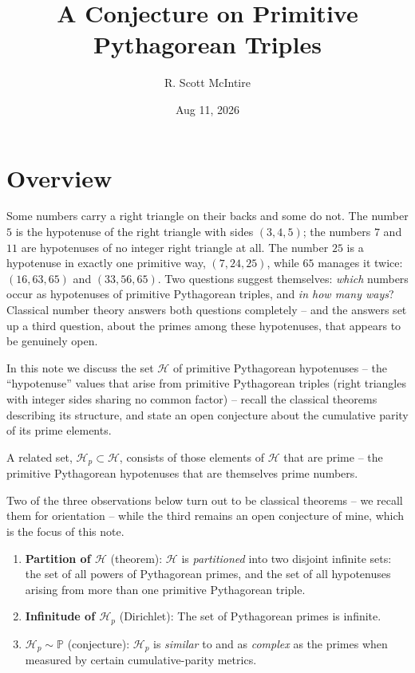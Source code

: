 \documentclass{article}
\title{A Conjecture on Primitive Pythagorean Triples}
\author{R. Scott McIntire}
\date{Aug 11, 2026}
\theoremstyle{plain}
\theoremstyle{definition}
\theoremstyle{remark}
\begin{document}
\maketitle


\section{Overview}
Some numbers carry a right triangle on their backs and some do not.
The number $5$ is the hypotenuse of the right triangle with sides
$(3,4,5)$; the numbers $7$ and $11$ are hypotenuses of no integer right
triangle at all. The number $25$ is a hypotenuse in exactly one
primitive way, $(7,24,25)$, while $65$ manages it twice:
$(16,63,65)$ and $(33,56,65)$. Two questions suggest themselves:
{\em which\/} numbers occur as hypotenuses of primitive Pythagorean
triples, and {\em in how many ways\/}? Classical number theory answers
both questions completely -- and the answers set up a third question,
about the primes among these hypotenuses, that appears to be genuinely
open.

In this note we discuss the set $\mathcal{H}$ of primitive Pythagorean hypotenuses --
the ``hypotenuse'' values that arise from primitive Pythagorean triples
(right triangles with integer sides sharing no common factor) --
recall the classical theorems describing its structure, and state
an open conjecture about the cumulative parity of its prime elements.

A related set, $\mathcal{H}_p \subset \mathcal{H}$, consists of those elements of
$\mathcal{H}$ that are prime -- the primitive Pythagorean hypotenuses that are
themselves prime numbers.

Two of the three observations below turn out to be classical theorems --
we recall them for orientation -- while the third remains an open conjecture
of mine, which is the focus of this note.
\begin{enumerate}
    \item \textbf{Partition of $\mathcal{H}$} (theorem): $\mathcal{H}$ is {\em partitioned\/}
      into two disjoint infinite sets: the set of all powers of Pythagorean primes,
      and the set of all hypotenuses arising from more than one primitive Pythagorean triple.
    \item \textbf{Infinitude of $\mathcal{H}_p$} (Dirichlet): The set of Pythagorean
      primes is infinite.
    \item \textbf{$\mathcal{H}_p \sim \mathbb{P}$} (conjecture): $\mathcal{H}_p$ is {\em similar\/}
      to and as {\em complex\/} as the primes when measured by certain
      cumulative-parity metrics.
\end{enumerate}
\end{document}
